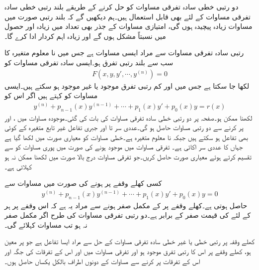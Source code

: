 دو رتبی خطی سادہ تفرقی مساوات کو حل کرنے کے طریقے بلند رتبی خطی سادہ تفرقی مساوات کے لئے بھی قابل استعمال ہیں۔ہم دیکھیں گے کہ بلند رتبی صورت میں مساوات زیادہ پیچیدہ ہوں گی،  امتیازی مساوات کے جذر بھی تعداد میں زیادہ اور حصول میں نسبتاً مشکل ہوں گے اور  زیادہ اہم کردار ادا کرے گا۔ 

 رتبی سادہ تفرقی مساوات سے مراد ایسی مساوات ہے جس میں نا معلوم متغیرہ  کا  سب سے بلند رتبی تفرق ہو۔ایسی سادہ تفرقی مساوات کو
\begin{align*}
F(x,y,y',\cdots, y^{(n)})=0
\end{align*}
لکھا جا سکتا ہے جس میں  اور کم رتبی تفرق موجود یا غیر موجود ہو سکتے ہیں۔ایسی مساوات کو  کہتے ہیں اگر اس کو 
\begin{align}\label{مساوات_سادہ_بلند_خطی_الف}
y^{(n)}+p_{n-1}(x)y^{(n-1)}+\cdots+p_1(x)y'+p_0(x)y=r(x)
\end{align}
لکھنا ممکن ہو۔صفحہ  پر دو رتبی خطی سادہ تفرقی مساوات کی بات کی گئی۔موجودہ مساوات میں ،  اور  پر کرنے سے دو رتبی مساوات حاصل ہو گی۔عددی سر  تا   اور جبری تفاعل  غیر تابع متغیرہ   کے کوئی بھی تفاعل ہو سکتے ہیں جبکہ  نا معلوم متغیرہ ہے۔خطی مساوات کو معیاری صورت میں لکھا گیا ہے جہاں  کا عددی سر اکائی  ہے۔ تفرقی مساوات میں   موجود ہونے کی صورت میں پوری مساوات کو  سے تقسیم کرتے ہوئے معیاری صورت حاصل کریں۔جو تفرقی مساوات درج بالا صورت میں لکھنا ممکن نہ ہو  کہلاتی ہے۔

کسی کھلے وقفے  پر    ہونے کی صورت میں  مساوات  سے 
\begin{align}\label{مساوات_سادہ_بلند_خطی_ب}
y^{(n)}+p_{n-1}(x)y^{(n-1)}+\cdots+p_1(x)y'+p_0(x)y=0
\end{align}
حاصل ہوتی ہے۔کھلے وقفے پر  کے مکمل صفر ہونے سے مراد یہ ہے کہ اس وقفے پر ہر  کے لئے  کی قیمت صفر کے برابر ہے۔دو رتبی تفرقی مساوات کی طرح  اگر  مکمل صفر نہ ہو تب مساوات  کہلائے گی۔

کھلے وقفہ  پر  رتبی خطی یا غیر خطی سادہ تفرقی مساوات کے حل  سے مراد ایسا تفاعل ہے جو  پر معین ہو،  کھلے وقفے پر اس کا  رتبی تفرق موجود ہو اور تفرقی مساوات میں  اور اس کے تفرقات کی جگہ  اور اس کے تفرقات پر کرنے سے مساوات کے دونوں اطراف بالکل یکساں حاصل ہوں۔ 

